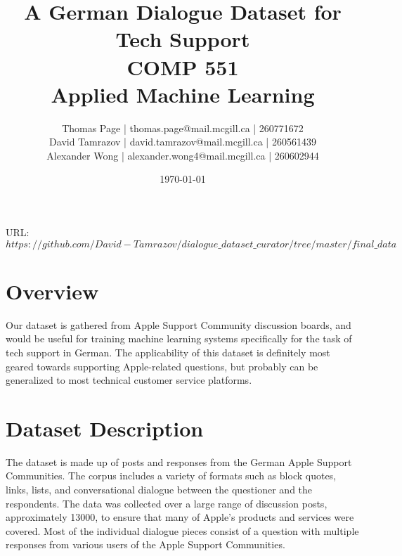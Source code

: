 \documentclass[10pt]{article}
\title{A German Dialogue Dataset for Tech Support\\ COMP 551 \\ Applied Machine Learning} %
\author{
Thomas Page | thomas.page@mail.mcgill.ca | 260771672 \\
David Tamrazov | david.tamrazov@mail.mcgill.ca | 260561439 \\
Alexander Wong | alexander.wong4@mail.mcgill.ca | 260602944} %
\date{\today} %
\begin{document}
\maketitle %


%

\begin{center}
URL: \texttt{$https://github.com/David-Tamrazov/dialogue\_dataset\_curator/tree/master/final\_data$}
\end{center}
\begin{multicols}{2}

\section{Overview}
Our dataset is gathered from Apple Support Community discussion boards, and would be useful for training machine learning systems specifically for the task of tech support in German. The applicability of this dataset is definitely most geared towards supporting Apple-related questions, but probably can be generalized to most technical customer service platforms.


\section{Dataset Description}
The dataset is made up of posts and responses from the German Apple Support Communities. The corpus includes a variety of formats such as block quotes, links, lists, and conversational dialogue between the questioner and the respondents. The data was collected over a large range of discussion posts, approximately 13000, to ensure that many of Apple's products and services were covered. Most of the individual dialogue pieces consist of a question with multiple responses from various users of the Apple Support Communities.\\


\end{multicols}
\end{document}
